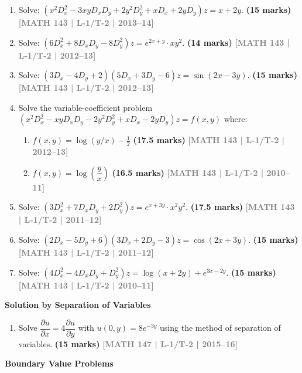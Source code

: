 \documentclass[12pt,a3paper]{article}
\newcommand{\yr}[1]{\hfill\textcolor{gray}{\small\textbf{[#1]}}}
\newcommand{\mk}[1]{\textcolor{orange!70!black}{\small\textbf{(#1 marks)}}}
\newcommand{\subtopic}[2]{%
  \vspace{10pt}
  \noindent\begin{tcolorbox}[colback=#1!8,colframe=#1,boxrule=0.6pt,arc=4pt,
    left=6pt,right=6pt,top=4pt,bottom=4pt]
    \small\bfseries\textcolor{#1}{#2}
  \end{tcolorbox}
  \vspace{2pt}
}
\begin{document}
\begin{enumerate}
\item Solve: $(x^{2}D_{x}^{2}-3xyD_{x}D_{y}+2y^{2}D_{y}^{2}+xD_{x}+2yD_{y})z=x+2y$.
\mk{15} \yr{MATH 143 | L-1/T-2 | 2013--14}


\item Solve: $(6D_{x}^{2}+8D_{x}D_{y}-8D_{y}^{2})z=e^{2x+y}\cdot xy^{2}$.
\mk{14} \yr{MATH 143 | L-1/T-2 | 2012--13}


\item Solve: $(3D_{x}-4D_{y}+2)(5D_{x}+3D_{y}-6)z=\sin(2x-3y)$.
\mk{15} \yr{MATH 143 | L-1/T-2 | 2012--13}


\item Solve the variable-coefficient problem $(x^{2}D_{x}^{2}-xyD_{x}D_{y}-2y^{2}D_{y}^{2}+xD_{x}-2yD_{y})z = f(x,y)$ where:
\begin{enumerate}
  \item $f(x,y) = \log(y/x)-\tfrac{1}{2}$ \mk{17.5} \yr{MATH 143 | L-1/T-2 | 2012--13}
  \item $f(x,y) = \log\left(\dfrac{y}{x}\right)$ \mk{16.5} \yr{MATH 143 | L-1/T-2 | 2010--11}
\end{enumerate}


\item Solve: $(3D_{x}^{2}+7D_{x}D_{y}+2D_{y}^{2})z=e^{x+3y}\cdot x^{2}y^{2}$.
\mk{17.5} \yr{MATH 143 | L-1/T-2 | 2011--12}


\item Solve: $(2D_{x}-5D_{y}+6)(3D_{x}+2D_{y}-3)z=\cos(2x+3y)$.
\mk{15} \yr{MATH 143 | L-1/T-2 | 2011--12}


\item Solve: $(4D_{x}^{2}-4D_{x}D_{y}+D_{y}^{2})z=\log(x+2y)+e^{3x-2y}$.
\mk{15} \yr{MATH 143 | L-1/T-2 | 2010--11}


\end{enumerate}

\subtopic{cF}{Solution by Separation of Variables}
\label{sub:s6-separation}

\begin{enumerate}

\item Solve $\dfrac{\partial u}{\partial x}=4\dfrac{\partial u}{\partial y}$ with $u(0,y)=8e^{-3y}$ using the method of separation of variables.
\mk{15} \yr{MATH 147 | L-1/T-2 | 2015--16}


\end{enumerate}

\subtopic{cF}{Boundary Value Problems}
\label{sub:s6-bvp}
\end{document}
